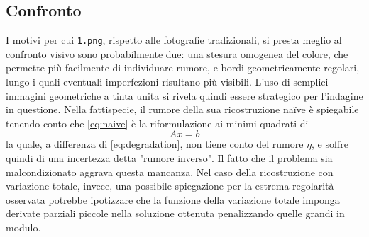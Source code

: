 \documentclass[a4paper]{article}
\begin{document}
\subsection{Confronto}
I motivi per cui \verb!1.png!, rispetto alle fotografie tradizionali, si presta
meglio al confronto visivo sono probabilmente due: una stesura omogenea del
colore, che permette più facilmente di individuare rumore, e bordi
geometricamente regolari, lungo i quali eventuali imperfezioni risultano più
visibili. L'uso di semplici immagini geometriche a tinta unita si rivela quindi
essere strategico per l'indagine in questione. Nella fattispecie, il rumore
della sua ricostruzione naïve è spiegabile tenendo conto che \ref{eq:naive} è la
riformulazione ai minimi quadrati di
\begin{equation}
  Ax = b
\end{equation}
la quale, a differenza di \ref{eq:degradation}, non tiene conto del rumore
$\eta$, e soffre quindi di una incertezza detta "rumore inverso". Il fatto che
il problema sia malcondizionato aggrava questa mancanza. Nel caso della
ricostruzione con variazione totale, invece, una possibile spiegazione per la
estrema regolarità osservata potrebbe ipotizzare che la funzione della
variazione totale imponga derivate parziali piccole nella soluzione ottenuta
penalizzando quelle grandi in modulo.
\end{document}
